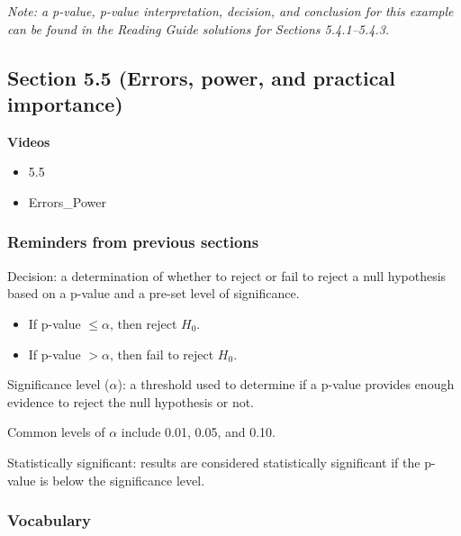 \documentclass[
]{report}
\providecommand{\tightlist}{%
  \setlength{\itemsep}{0pt}\setlength{\parskip}{0pt}}
\newcommand{\rgi}{\hspace{24pt}}  %
\begin{document}
\emph{Note: a p-value, p-value interpretation, decision, and conclusion for this example can be found in the Reading Guide solutions for Sections 5.4.1--5.4.3.}

\hypertarget{section-5.5-errors-power-and-practical-importance}{%
\subsection*{Section 5.5 (Errors, power, and practical importance)}\label{section-5.5-errors-power-and-practical-importance}}


\textbf{Videos}

\begin{itemize}
\tightlist
\item
  5.5
\item
  Errors\_Power
\end{itemize}


\hypertarget{reminders-from-previous-sections-5}{%
\subsubsection*{Reminders from previous sections}\label{reminders-from-previous-sections-5}}

Decision: a determination of whether to reject or fail to reject a null hypothesis based on a p-value and a pre-set level of significance.

\begin{itemize}
\item
  If p-value \(\leq \alpha\), then reject \(H_0\).
\item
  If p-value \(> \alpha\), then fail to reject \(H_0\).
\end{itemize}

Significance level (\(\alpha\)): a threshold used to determine if a p-value provides enough evidence to reject the null hypothesis or not.

\rgi Common levels of \(\alpha\) include 0.01, 0.05, and 0.10.

Statistically significant: results are considered statistically significant if the p-value is below the significance level.

\hypertarget{vocabulary-16}{%
\subsubsection*{Vocabulary}\label{vocabulary-16}}
\end{document}
